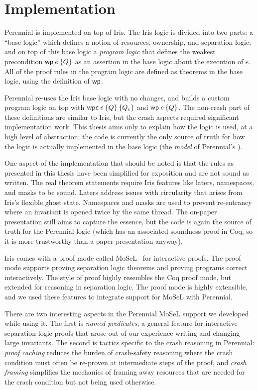 \section{Implementation}
\label{sec:perennial:impl}

Perennial is implemented on top of Iris. The Iris logic is divided into two
parts: a ``base logic'' which defines a notion of resources, ownership, and
separation logic, and on top of this base logic a \emph{program logic} that
defines the weakest precondition $\wpre{e}{Q}$ as an assertion in the base logic
about the execution of $e$. All of the proof rules in the program logic are
defined as theorems in the base logic, using the definition of $\textsf{\upshape wp}$.

Perennial re-uses the Iris base logic with no changes, and builds a custom
program logic on top with $\wpc{e}{Q}{Q_{c}}$ and $\wpre{e}{Q}$. The non-crash
part of these definitions are similar to Iris, but the crash aspects required
significant implementation work. This thesis aims only to explain how the logic
is used, at a high level of abstraction; the code is currently the only
source of truth for how the logic is actually implemented in the base logic (the
\emph{model} of Perennial's \wpcw).

One aspect of the implementation that should be noted is that the rules as
presented in this thesis have been simplified for exposition and are not sound
as written. The real theorem statements require Iris features like laters,
namespaces, and masks to be sound. Laters address issues with circularity that
arises from Iris's flexible ghost state. Namespaces and masks are used to
prevent re-entrancy where an invariant is opened twice by the same thread. The
on-paper presentation still aims to capture the essence, but the code is again
the source of truth for the Perennial logic (which has an associated soundness
proof in Coq, so it is more trustworthy than a paper presentation anyway).

Iris comes with a proof mode called MoSeL~\cite{krebbers:ipm,krebbers:mosel} for
interactive proofs. The proof mode supports proving separation logic theorems
and proving programs correct interactively. The style of proof highly resembles
the Coq proof mode, but extended for reasoning in separation logic. The proof
mode is highly extensible, and we used these features to integrate support for
MoSeL with Perennial.

There are two interesting aspects in the Perennial MoSeL support we developed
while using it. The first is \emph{named predicates}, a general feature for
interactive separation logic proofs that arose out of our experience writing and
changing large invariants. The second is tactics specific to the crash reasoning
in Perennial: \emph{proof caching} reduces the burden of crash-safety reasoning
where the crash condition must often be re-proven at intermediate steps of the
proof, and \emph{crash framing} simplifies the mechanics of framing away
resources that are needed for the crash condition but not being used otherwise.

